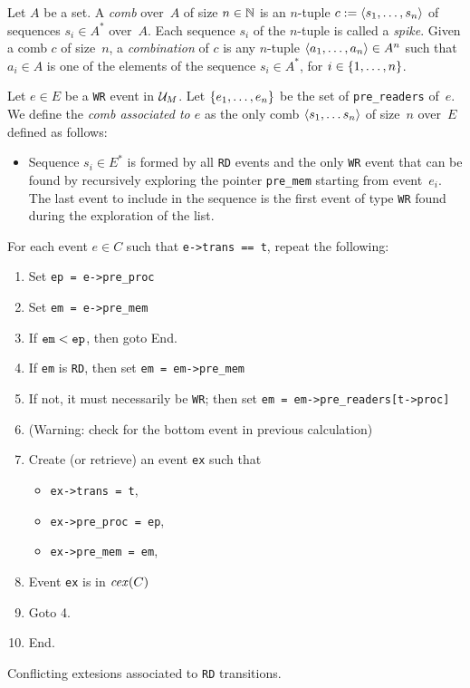 \documentclass{llncs}
\begin{document}
Let $A$ be a set.
A \emph{comb} over~$A$ of size $n \in \mathbb{N}$ is an $n$-tuple
$c \mathrel{:=} \langle s_1, \ldots, s_n\rangle$ of sequences $s_i \in A^*$
over~$A$.
Each sequence $s_i$ of the $n$-tuple is called a \emph{spike}.
Given a comb $c$ of size~$n$,
a \emph{combination} of $c$ is any $n$-tuple $\langle a_1, \ldots, a_n\rangle \in A^n$
such that $a_i \in A$ is one of the elements of the sequence $s_i \in A^*$, for
$i \in {\{ 1, \ldots, n \mathclose \}}$.

Let $e \in E$ be a \verb!WR! event in $\mathcal{U}_{M}$.
Let ${\{ e_1, \ldots, e_n \mathclose \}}$ be the set of \verb!pre_readers! of~$e$.
We define the \emph{comb associated to $e$} as the only comb
$\langle s_1, \ldots s_n\rangle$ of size~$n$ over~$E$ defined as follows:
\begin{itemize}
\item
  Sequence $s_i \in E^*$ is formed by all \verb!RD! events and the only
  \verb!WR! event that can be found by recursively exploring the pointer
  \verb!pre_mem! starting from event~$e_i$. The last event to include in the
  sequence is the first event of type \verb!WR! found during the exploration of
  the list.
\end{itemize}


\begin{algorithm}
\noindent
For each event $e \in C$ such that \verb!e->trans == t!, repeat the following:
\begin{enumerate}
\item Set \verb!ep = e->pre_proc!
\item Set \verb!em = e->pre_mem!
\item If $\verb!em! < \verb!ep!$, then goto End.
\item If \verb!em! is \verb!RD!, then set \verb!em = em->pre_mem!
\item If not, it must necessarily be \verb!WR!; then set \verb!em = em->pre_readers[t->proc]!
\item (Warning: check for the bottom event in previous calculation)
\item
  Create (or retrieve) an event \verb!ex! such that
  \begin{itemize}
  \item \verb!ex->trans = t!,
  \item \verb!ex->pre_proc = ep!,
  \item \verb!ex->pre_mem = em!,
  \end{itemize}
\item Event \verb!ex! is in $\mathop{\mathit{cex}} (C)$
\item Goto 4.
\item End.
\end{enumerate}
\caption{Conflicting extesions associated to \texttt{RD} transitions.}
\label{a:cex_rd}
\end{algorithm}
\end{document}
